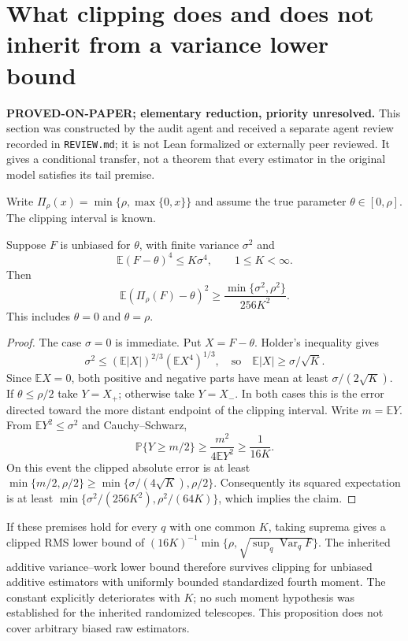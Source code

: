 \section{What clipping does and does not inherit from a variance lower bound}
\label{sec:clipping-boundary}
\noindent\textbf{PROVED-ON-PAPER; elementary reduction, priority unresolved.}
This section was constructed by the audit agent and received a separate agent
review recorded in \texttt{REVIEW.md}; it is not Lean formalized or externally
peer reviewed. It gives a conditional transfer, not a theorem
that every estimator in the original model satisfies its tail premise.

Write $\Pi_\rho(x)=\min\{\rho,\max\{0,x\}\}$ and assume the true parameter
$\theta\in[0,\rho]$. The clipping interval is known.

\begin{proposition}
Suppose $F$ is unbiased for $\theta$, with finite variance $\sigma^2$ and
\[
 \mathbb E(F-\theta)^4\le K\sigma^4,\qquad 1\le K<\infty.
\]
Then
\[
 \mathbb E(\Pi_\rho(F)-\theta)^2
 \ge\frac{\min\{\sigma^2,\rho^2\}}{256K^2}.
\]
This includes $\theta=0$ and $\theta=\rho$.
\end{proposition}
\begin{proof}
The case $\sigma=0$ is immediate. Put $X=F-\theta$. Holder's inequality gives
\[
 \sigma^2\le(\mathbb E|X|)^{2/3}(\mathbb EX^4)^{1/3},
 \quad\text{so}\quad \mathbb E|X|\ge\sigma/\sqrt K.
\]
Since $\mathbb EX=0$, both positive and negative parts have mean at least
$\sigma/(2\sqrt K)$. If $\theta\le\rho/2$ take $Y=X_+$; otherwise take
$Y=X_-$. In both cases this is the error directed toward the more distant
endpoint of the clipping interval. Write $m=\mathbb EY$.
From $\mathbb EY^2\le\sigma^2$ and Cauchy--Schwarz,
\[
 \mathbb P\{Y\ge m/2\}\ge\frac{m^2}{4\mathbb EY^2}
 \ge\frac1{16K}.
\]
On this event the clipped absolute error is at least
$\min\{m/2,\rho/2\}\ge\min\{\sigma/(4\sqrt K),\rho/2\}$.
Consequently its squared expectation is at least
$\min\{\sigma^2/(256K^2),\rho^2/(64K)\}$, which implies the claim.
\end{proof}

If these premises hold for every $q$ with one common $K$, taking suprema
gives a clipped RMS lower bound of
$(16K)^{-1}\min\{\rho,\sqrt{\sup_q\operatorname{Var}_qF}\}$.
The inherited additive variance--work lower bound therefore survives
clipping for unbiased additive estimators with uniformly bounded standardized
fourth moment. The constant explicitly deteriorates with $K$; no such
moment hypothesis was established for the inherited randomized telescopes.
This proposition does not cover arbitrary biased raw estimators.

